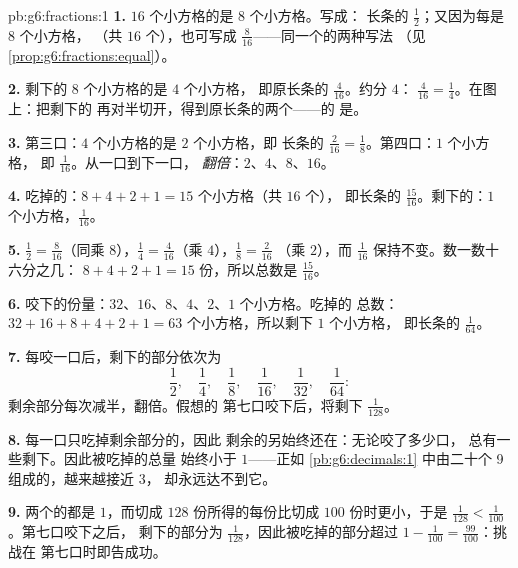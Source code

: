 \begin{solution}{pb:g6:fractions:1}
\textbf{1.} $16$ 个小方格的是 $8$ 个小方格。写成：
长条的 $\frac12$；又因为每是 $8$ 个小方格，
（共 $16$ 个），也可写成 $\frac{8}{16}$——同一个的两种写法
（见\cref{prop:g6:fractions:equal}）。

\textbf{2.} 剩下的 $8$ 个小方格的是 $4$ 个小方格，
即原长条的 $\frac{4}{16}$。约分 $4$：
$\frac{4}{16} = \frac14$。在图上：把剩下的
再对半切开，得到原长条的两个——的
是。

\textbf{3.} 第三口：$4$ 个小方格的是 $2$ 个小方格，即
长条的 $\frac{2}{16} = \frac18$。第四口：$1$ 个小方格，
即 $\frac{1}{16}$。从一口到下一口，
\emph{翻倍}：$2$、$4$、$8$、$16$。

\textbf{4.} 吃掉的：$8 + 4 + 2 + 1 = 15$ 个小方格（共 $16$ 个），
即长条的 $\frac{15}{16}$。剩下的：$1$ 个小方格，$\frac{1}{16}$。

\textbf{5.} $\frac12 = \frac{8}{16}$（同乘
$8$），$\frac14 = \frac{4}{16}$（乘 $4$），$\frac18 = \frac{2}{16}$
（乘 $2$），而 $\frac{1}{16}$ 保持不变。数一数十六分之几：
$8 + 4 + 2 + 1 = 15$ 份，所以总数是 $\frac{15}{16}$。

\textbf{6.} 咬下的份量：$32$、$16$、$8$、$4$、$2$、$1$ 个小方格。吃掉的
总数：$32 + 16 + 8 + 4 + 2 + 1 = 63$ 个小方格，所以剩下 $1$ 个小方格，
即长条的 $\frac{1}{64}$。

\textbf{7.} 每咬一口后，剩下的部分依次为
\[
\frac12,\quad \frac14,\quad \frac18,\quad \frac{1}{16},\quad
\frac{1}{32},\quad \frac{1}{64} :
\]
剩余部分每次减半，翻倍。假想的
第七口咬下后，将剩下 $\frac{1}{128}$。

\textbf{8.} 每一口只吃掉剩余部分的\emph{}，因此
剩余的另始终还在：无论咬了多少口，
总有一些剩下。因此被吃掉的总量
始终小于 $1$——正如
\cref{pb:g6:decimals:1} 中由二十个 9 组成的，越来越接近 $3$，
却永远达不到它。

\textbf{9.} 两个的都是 $1$，而切成
$128$ 份所得的每份比切成 $100$ 份时更小，于是
$\frac{1}{128} < \frac{1}{100}$。第七口咬下之后，
剩下的部分为 $\frac{1}{128}$，因此被吃掉的部分超过
$1 - \frac{1}{100} = \frac{99}{100}$：挑战在
第七口时即告成功。


\end{solution}
